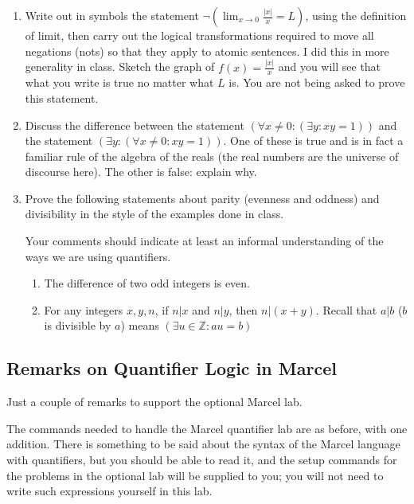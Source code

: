 \documentclass[12pt]{article}
\begin{document}
\begin{enumerate}

\item Write out in symbols the statement $\neg (\lim_{x \rightarrow 0} \frac{|x|}x = L)$, using the definition of limit, then carry out the logical transformations required to
move all negations (nots) so that they apply to atomic sentences.  I did this in more generality in class.  Sketch the graph of $f(x) = \frac{|x|}x$ and you will see that
what you write is true no matter what $L$ is.  You are not being asked to prove this statement.

\item  Discuss the difference between the statement $(\forall x\neq 0:(\exists y:xy=1))$ and the statement $(\exists y:(\forall x \neq 0:xy=1))$.  One of these is true and is in fact
a familiar rule of the algebra of the reals (the real numbers are the universe of discourse here).  The other is false:  explain why.

\item Prove the following statements about parity (evenness and oddness) and divisibility in the style of the examples done in class.

Your comments should indicate at least an informal understanding of the ways we are using quantifiers.  

\begin{enumerate}


\item  The difference of two odd integers is even.

\item  For any integers $x,y,n$, if $n|x$ and $n|y$, then $n|(x+y)$.  Recall that $a|b$ ($b$ is divisible by $a$) means $(\exists u \in \mathbb Z:au=b)$


\end{enumerate}
\end{enumerate}

\subsection{Remarks on Quantifier Logic in Marcel}

Just a couple of remarks to support the optional Marcel lab.

The commands needed to handle the Marcel quantifier lab are as before, with one addition.  There is something to be said about the syntax of the Marcel language with quantifiers, but you should be able to read it, and the setup commands for the problems in the optional lab will be supplied to you; you will not need to write such expressions yourself in this lab.
\end{document}
